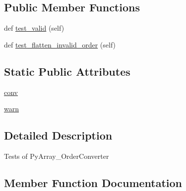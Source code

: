\subsection*{Public Member Functions}
\begin{DoxyCompactItemize}
\item 
def \hyperlink{classnumpy_1_1core_1_1tests_1_1test__conversion__utils_1_1TestOrderConverter_a7d002a64f696172c75b22dfdb073c186}{test\+\_\+valid} (self)
\item 
def \hyperlink{classnumpy_1_1core_1_1tests_1_1test__conversion__utils_1_1TestOrderConverter_a7e61351459d6b6eb9744584d465a9dd9}{test\+\_\+flatten\+\_\+invalid\+\_\+order} (self)
\end{DoxyCompactItemize}
\subsection*{Static Public Attributes}
\begin{DoxyCompactItemize}
\item 
\hyperlink{classnumpy_1_1core_1_1tests_1_1test__conversion__utils_1_1TestOrderConverter_ac4fd6682bdcaa703c6dcc40f8bb7c68d}{conv}
\item 
\hyperlink{classnumpy_1_1core_1_1tests_1_1test__conversion__utils_1_1TestOrderConverter_a1e1a5dabfdb7f5761a6b6836b9de80d7}{warn}
\end{DoxyCompactItemize}


\subsection{Detailed Description}
\begin{DoxyVerb}Tests of PyArray_OrderConverter \end{DoxyVerb}
 

\subsection{Member Function Documentation}
\mbox{\label{classnumpy_1_1core_1_1tests_1_1test__conversion__utils_1_1TestOrderConverter_a7e61351459d6b6eb9744584d465a9dd9}} 
